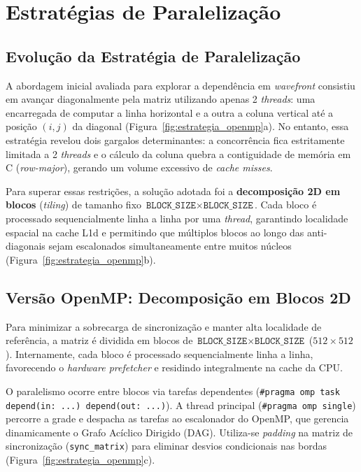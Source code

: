 \section{Estratégias de Paralelização}
\label{sec:paralelizacao}

\subsection{Evolução da Estratégia de Paralelização}
\label{sec:discussao_inicial}

A abordagem inicial avaliada para explorar a dependência em \textit{wavefront} consistiu em avançar diagonalmente pela matriz utilizando apenas 2 \textit{threads}: uma encarregada de computar a linha horizontal e a outra a coluna vertical até a posição $(i, j)$ da diagonal (Figura~\ref{fig:estrategia_openmp}a). No entanto, essa estratégia revelou dois gargalos determinantes: a concorrência fica estritamente limitada a 2 \textit{threads} e o cálculo da coluna quebra a contiguidade de memória em C (\textit{row-major}), gerando um volume excessivo de \textit{cache misses}.

Para superar essas restrições, a solução adotada foi a \textbf{decomposição 2D em blocos} (\textit{tiling}) de tamanho fixo $\texttt{BLOCK\_SIZE} \times \texttt{BLOCK\_SIZE}$. Cada bloco é processado sequencialmente linha a linha por uma \textit{thread}, garantindo localidade espacial na cache L1d e permitindo que múltiplos blocos ao longo das anti-diagonais sejam escalonados simultaneamente entre muitos núcleos (Figura~\ref{fig:estrategia_openmp}b).

\subsection{Versão OpenMP: Decomposição em Blocos 2D}
\label{sec:openmp}

Para minimizar a sobrecarga de sincronização e manter alta localidade de referência, a matriz é dividida em blocos de $\texttt{BLOCK\_SIZE} \times \texttt{BLOCK\_SIZE}$ ($512 \times 512$). Internamente, cada bloco é processado sequencialmente linha a linha, favorecendo o \textit{hardware prefetcher} e residindo integralmente na cache da CPU.

O paralelismo ocorre entre blocos via tarefas dependentes (\texttt{\#pragma omp task depend(in: ...) depend(out: ...)}). A thread principal (\texttt{\#pragma omp single}) percorre a grade e despacha as tarefas ao escalonador do OpenMP, que gerencia dinamicamente o Grafo Acíclico Dirigido (DAG). Utiliza-se \textit{padding} na matriz de sincronização (\texttt{sync\_matrix}) para eliminar desvios condicionais nas bordas (Figura~\ref{fig:estrategia_openmp}c).

